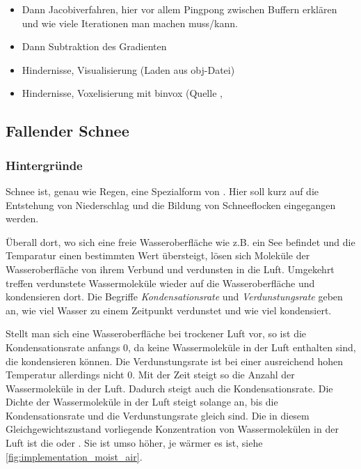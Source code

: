 \begin{itemize}
\item Dann Jacobiverfahren, hier vor allem Pingpong zwischen Buffern erklären
und wie viele Iterationen man machen muss/kann.
\item Dann Subtraktion des Gradienten
\item Hindernisse, Visualisierung (Laden aus obj-Datei)
\item Hindernisse, Voxelisierung mit binvox (Quelle \cite{Nooruddin2003}, \cite{binvox2012}
\end{itemize}

\subsection{Fallender Schnee}

\subsubsection{Hintergründe}

Schnee ist, genau wie Regen, eine Spezialform von .
Hier soll kurz auf die Entstehung von Niederschlag und die Bildung von
Schneeflocken eingegangen werden\cite{wiki:Luftfeuchtigkeit}.

Überall dort, wo sich eine freie Wasseroberfläche wie z.B. ein See befindet und
die Temparatur einen bestimmten Wert übersteigt, lösen sich Moleküle der
Wasseroberfläche von ihrem Verbund und verdunsten in die Luft. Umgekehrt treffen
verdunstete Wassermoleküle wieder auf die Wasseroberfläche und kondensieren
dort. Die Begriffe \emph{Kondensationsrate} und
\emph{Verdunstungsrate} geben an, wie viel Wasser zu einem Zeitpunkt
verdunstet und wie viel kondensiert.

Stellt man sich eine Wasseroberfläche bei trockener Luft vor, so ist
die Kondensationsrate anfangs 0, da keine Wassermoleküle in der Luft
enthalten sind, die kondensieren können. Die Verdunstungsrate ist
bei einer ausreichend hohen Temperatur allerdings nicht 0. Mit der
Zeit steigt so die Anzahl der Wassermoleküle in der Luft. Dadurch
steigt auch die Kondensationsrate. Die Dichte der Wassermoleküle in
der Luft steigt solange an, bis die Kondensationsrate und die
Verdunstungsrate gleich sind. Die in diesem Gleichgewichtszustand
vorliegende Konzentration von Wassermolekülen in der Luft ist die
 oder . Sie ist umso höher, je wärmer es ist, siehe
\autoref{fig:implementation_moist_air}.


